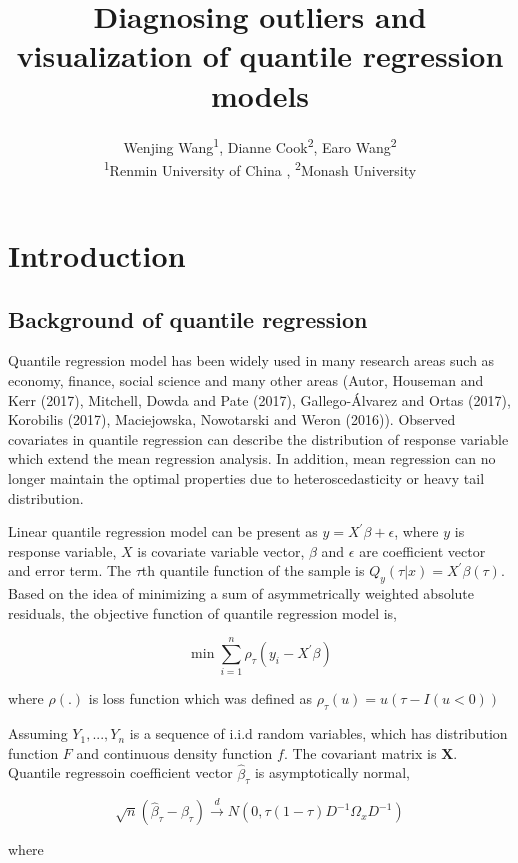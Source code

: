 \documentclass[11pt,a4paper,]{article}
\title{Diagnosing outliers and visualization of quantile regression models}
\author{Wenjing Wang\textsuperscript{1}, Dianne Cook\textsuperscript{2}, Earo
Wang\textsuperscript{2} \\ \textsuperscript{1}Renmin University of China ,
\textsuperscript{2}Monash University}
\date{}
\theoremstyle{definition}
\theoremstyle{definition}
\theoremstyle{remark}
\begin{document}
\maketitle

{
\setcounter{tocdepth}{2}
\tableofcontents
}
\section{Introduction}\label{introduction}

\subsection{Background of quantile
regression}\label{background-of-quantile-regression}

Quantile regression model has been widely used in many research areas
such as economy, finance, social science and many other areas (Autor,
Houseman and Kerr (2017), Mitchell, Dowda and Pate (2017),
Gallego-Álvarez and Ortas (2017), Korobilis (2017), Maciejowska,
Nowotarski and Weron (2016)). Observed covariates in quantile regression
can describe the distribution of response variable which extend the mean
regression analysis. In addition, mean regression can no longer maintain
the optimal properties due to heteroscedasticity or heavy tail
distribution.

Linear quantile regression model can be present as
\(y=X^{'}\beta+\epsilon\), where \(y\) is response variable, \(X\) is
covariate variable vector, \(\beta\) and \(\epsilon\) are coefficient
vector and error term. The \(\tau\)th quantile function of the sample is
\(Q_{y}(\tau|x)=X^{'}\beta(\tau)\). Based on the idea of minimizing a
sum of asymmetrically weighted absolute residuals, the objective
function of quantile regression model is,

\[\min\sum_{i=1}^{n} \rho_{\tau}(y_i-X^{'}\beta)\]

where \(\rho(.)\) is loss function which was defined as
\(\rho_{\tau}(u)=u(\tau-I(u <0))\)

Assuming \(Y_1,...,Y_n\) is a sequence of i.i.d random variables, which
has distribution function \(F\) and continuous density function \(f\).
The covariant matrix is \(\textbf{X}\). Quantile regressoin coefficient
vector \(\hat{\beta}_{\tau}\) is asymptotically normal,

\[\sqrt{n}(\hat{\beta}_{\tau}-\beta_{\tau}) \xrightarrow{d} N(0, \tau(1-\tau)D^{-1}\varOmega_{x}D^{-1})\]

where
\end{document}
